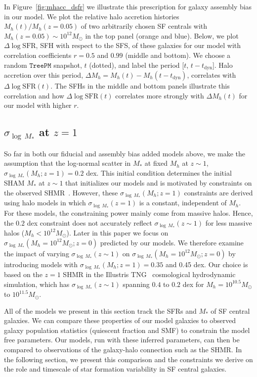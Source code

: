 \documentclass[12pt, letterpaper, preprint, tighten]{aastex62}
\newcommand{\edt}[1]{{\color{dred}{\bf} #1}}
\newcommand{\logsfr}{\log\mathrm{SFR}}
\begin{document}
In Figure~\ref{fig:mhacc_dsfr} we illustrate this prescription for galaxy
assembly bias in our model. We plot the relative halo accretion histories 
$M_h(t)/M_h(z{=}0.05)$ of two arbitrarily chosen SF centrals with 
$M_h(z{=}0.05)\sim10^{12}M_\odot$ in the top panel (orange and blue). Below, we plot 
$\Delta\logsfr$, SFH with respect to the SFS, of these galaxies for our model with 
correlation coefficients $r=0.5$ and $0.99$ (middle and bottom). We choose a
random $\mathtt{TreePM}$ snapshot, $t$ (dotted), and label the period 
[$t$, $t - t_\mathrm{dyn}$]. Halo accretion over this period, 
$\Delta M_h = M_h(t) - M_h(t-t_\mathrm{dyn})$, correlates with $\Delta\logsfr(t)$. 
The SFHs in the middle and bottom panels illustrate this correlation and how 
$\Delta\logsfr(t)$ correlates more strongly with $\Delta M_h(t)$ for our model 
with higher $r$. 

\subsection{\edt{$\sigma_{\log\,M_*}$ at $z=1$}} 
\edt{So far in both our fiducial and assembly bias added models above, we make the 
assumption that the log-normal scatter in $M_*$ at fixed $M_h$ at $z\sim1$, 
$\sigma_{\log\,M_*}(M_h; z=1) = 0.2$ dex. This initial condition determines
the initial SHAM $M_*$ at $z\sim1$ that initializes our models and is motivated
by constraints on the observed 
SHMR~\citep[\emph{e.g.}][]{leauthaud2012, tinker2013, patel2015}. However, 
these $\sigma_{\log\,M_*}(M_h; z=1)$ constraints are derived using halo models 
in which $\sigma_{\log\,M_*}(z = 1)$ is a constant, independent of $M_h$. 
For these models, the constraining power mainly come from massive halos. 
Hence, the $0.2$ dex constraint does not accurately reflect $\sigma_{\log\,M_*}(z\sim1)$ 
for less massive halos ($M_h < 10^{12}M_\odot$). 
Later in this paper we focus on $\sigma_{\log\,M_*}(M_h=10^{12}M_\odot; z=0)$ 
predicted by our models. We therefore examine the impact of varying 
$\sigma_{\log\,M_*}(z\sim1)$ on $\sigma_{\log\,M_*}(M_h=10^{12}M_\odot; z=0)$ 
by introducing models with $\sigma_{\log\,M_*}(M_h; z=1) = 0.35$ and 0.45 dex. 
Our choice is based on the $z=1$ SHMR in the Illustris TNG~\citep{pillepich2018} 
cosmological hydrodynamic simulation, which has $\sigma_{\log\,M_*}(z\sim1)$ 
spanning $0.4$ to $0.2$ dex for $M_h = 10^{10.5}M_\odot$ to $10^{11.5}M_\odot$.}

\edt{All of the models we present in this section track the SFRs and $M_*$ of SF 
central galaxies. We can compare these properties of our model galaxies 
to observed galaxy population statistics (quiescent fraction and SMF) to 
constrain the model free parameters.} 
Our models, run with these inferred 
parameters, can then be compared to observations of the galaxy-halo connection 
such as the SHMR. In the following section, we present this comparison and 
the constraints we derive on the role and timescale of star formation 
variability in SF central galaxies.
\end{document}
